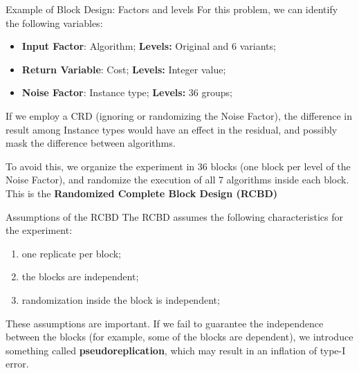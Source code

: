 \begin{frame}{Example of Block Design: Factors and levels}
  For this problem, we can identify the following variables:
  \begin{itemize}
    \item {\bf Input Factor}: Algorithm; {\bf Levels:} Original and 6 variants;
    \item {\bf Return Variable}: Cost; {\bf Levels:} Integer value;
    \item {\bf Noise Factor}: Instance type; {\bf Levels:} 36 groups;
  \end{itemize}\bigskip

  If we employ a CRD (ignoring or randomizing the Noise Factor), the difference
  in result among Instance types would have an effect in the residual, and possibly mask
  the difference between algorithms.\bigskip

  To avoid this, we organize the experiment in 36 blocks (one block per level of
  the Noise Factor), and randomize the execution of all 7 algorithms inside each block.
  This is the {\bf Randomized Complete Block Design (RCBD)}
\end{frame}

\begin{frame}{Assumptions of the RCBD}
  The RCBD assumes the following characteristics for the experiment:
  \begin{enumerate}
    \item one replicate per block;
    \item the blocks are independent;
    \item randomization inside the block is independent;
  \end{enumerate}\bigskip

  These assumptions are important. If we fail to guarantee the
  independence between the blocks (for example, some of the blocks are dependent),
  we introduce something called {\bf pseudoreplication}, which may result in
  an inflation of type-I error.
\end{frame}

